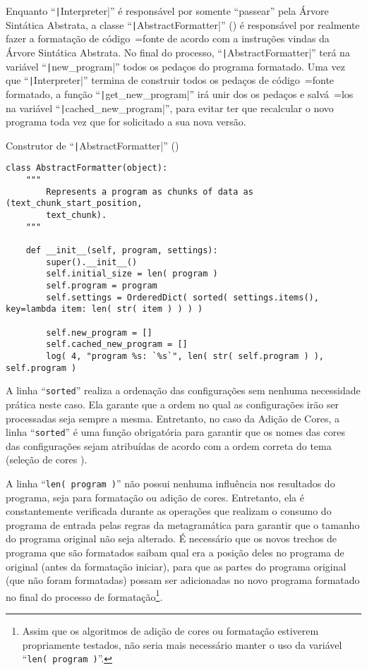 Enquanto ``\texttt|Interpreter|'' é responsável por somente ``passear'' pela Árvore Sintática Abstrata,
a classe ``\texttt|AbstractFormatter|'' () é responsável por realmente fazer a formatação de código~=fonte de acordo com a instruções vindas da Árvore Sintática Abstrata.
No final do processo,
``\texttt|AbstractFormatter|'' terá na variável ``\texttt|new_program|'' todos os pedaços do programa formatado.
Uma vez que ``\texttt|Interpreter|'' termina de construir todos os pedaços de código~=fonte formatado,
a função ``\texttt|get_new_program|'' irá unir dos os pedaços e
salvá~=los na variável ``\texttt|cached_new_program|'',
para evitar ter que recalcular o novo programa toda vez que for solicitado a sua nova versão.
\begin{code}
\caption[Construtor de ``AbstractFormatter'']{Construtor de ``\texttt|AbstractFormatter|'' ()}
\label{code:construtorDeParsedProgram}
\begin{verbatim}
class AbstractFormatter(object):
    """
        Represents a program as chunks of data as (text_chunk_start_position,
        text_chunk).
    """

    def __init__(self, program, settings):
        super().__init__()
        self.initial_size = len( program )
        self.program = program
        self.settings = OrderedDict( sorted( settings.items(), key=lambda item: len( str( item ) ) ) )

        self.new_program = []
        self.cached_new_program = []
        log( 4, "program %s: `%s`", len( str( self.program ) ), self.program )
\end{verbatim}
\end{code}

A linha ``\texttt{sorted}'' realiza a ordenação das configurações sem nenhuma necessidade prática neste caso.
Ela garante que a ordem no qual as configurações irão ser processadas seja sempre a mesma.
Entretanto,
no caso da Adição de Cores,
a linha ``\texttt{sorted}'' é uma função obrigatória para garantir que os nomes das cores das configurações sejam atribuídas de acordo com a ordem correta do tema (seleção de cores \cite{vsCodeSyntaxHighlighthing,sublimeTextScopeNaming}).

A linha ``\texttt{len( program )}'' não possui nenhuma influência nos resultados do programa,
seja para formatação ou
adição de cores.
Entretanto,
ela é constantemente verificada durante as operações que realizam o consumo do programa de entrada pelas regras da metagramática para garantir que o tamanho do programa original não seja alterado.
É necessário que os novos trechos de programa que são formatados saibam qual era a posição deles no programa de original (antes da formatação iniciar),
para que as partes do programa original (que não foram formatadas) possam ser adicionadas no novo programa formatado no final do processo de formatação\footnote{
Assim que os algoritmos de adição de cores ou
formatação estiverem propriamente testados,
não seria mais necessário manter o uso da variável ``\texttt{len( program )}''.
}.

